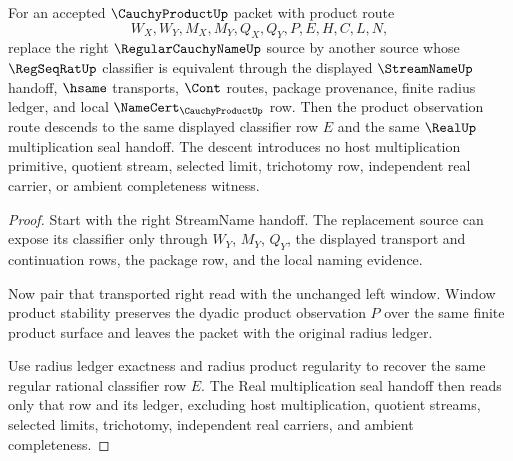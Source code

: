 \begin{theorem}
\label{thm:cauchy-product-right-factor-classifier-congruence}
For an accepted $\CauchyProductUp$ packet with product route
$$
W_X,W_Y,M_X,M_Y,Q_X,Q_Y,P,E,H,C,L,N,
$$
replace the right $\RegularCauchyNameUp$ source by another source whose $\RegSeqRatUp$ classifier is equivalent through the displayed $\StreamNameUp$ handoff, $\hsame$ transports, $\Cont$ routes, package provenance, finite radius ledger, and local $\NameCert_{\CauchyProductUp}$ row. Then the product observation route descends to the same displayed classifier row $E$ and the same $\RealUp$ multiplication seal handoff. The descent introduces no host multiplication primitive, quotient stream, selected limit, trichotomy row, independent real carrier, or ambient completeness witness.
\end{theorem}
\begin{proof}
Start with the right StreamName handoff. The replacement source can expose its classifier only through $W_Y$, $M_Y$, $Q_Y$, the displayed transport and continuation rows, the package row, and the local naming evidence.

Now pair that transported right read with the unchanged left window. Window product stability preserves the dyadic product observation $P$ over the same finite product surface and leaves the packet with the original radius ledger.

Use radius ledger exactness and radius product regularity to recover the same regular rational classifier row $E$. The Real multiplication seal handoff then reads only that row and its ledger, excluding host multiplication, quotient streams, selected limits, trichotomy, independent real carriers, and ambient completeness.
\end{proof}

